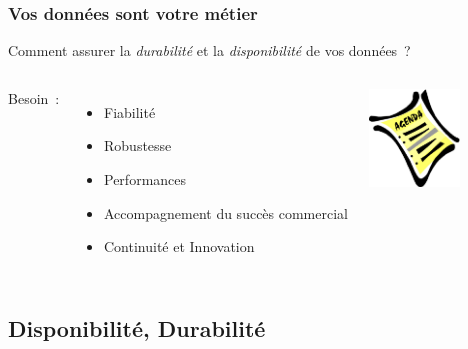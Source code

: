 \documentclass[english]{beamer}
\begin{document}
\begin{frame}[fragile]
  \frametitle{Vos données sont votre métier}

  \begin{center}
    Comment assurer la \textit{durabilité} et la \textit{disponibilité} de vos
    données ?
  \end{center}
  \linebreak

\begin{columns}[c]

  Besoin :

  \begin{itemize}
   \item<2-> Fiabilité
   \item<2-> Robustesse
   \item<2-> Performances
   \item<3-> Accompagnement du succès commercial
   \item<3-> Continuité et Innovation
  \end{itemize}  

\begin{center}
  \includegraphics[height=7em]{agenda.jpg}
\end{center}
\end{columns}
\end{frame}

\subsection{Disponibilité, Durabilité}
\frame{\tableofcontents[currentsubsection]}
\end{document}

